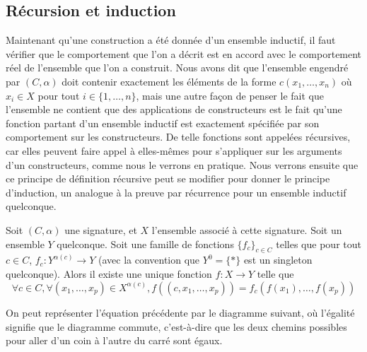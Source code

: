 \subsection{Récursion et induction}

Maintenant qu'une construction a été donnée d'un ensemble inductif, il faut
vérifier que le comportement que l'on a décrit est en accord avec le
comportement réel de l'ensemble que l'on a construit. Nous avons dit que
l'ensemble engendré par $(C,\alpha)$ doit contenir exactement les éléments de
la forme $c(x_1,\ldots,x_n)$ où $x_i \in X$ pour tout $i\in\{1,\ldots,n\}$, mais
une autre façon de penser le fait que l'ensemble ne contient que des
applications de constructeurs est le fait qu'une fonction partant d'un ensemble
inductif est exactement spécifiée par son comportement sur les constructeurs.
De telle fonctions sont appelées récursives, car elles peuvent faire appel à
elles-mêmes pour s'appliquer sur les arguments d'un constructeurs, comme nous le
verrons en pratique. Nous verrons ensuite que ce principe de définition
récursive peut se modifier pour donner le principe d'induction, un analogue à
la preuve par récurrence pour un ensemble inductif quelconque.

\begin{theorem}\label{thm.PU.ind}
  Soit $(C,\alpha)$ une signature, et $X$ l'ensemble associé à cette signature.
  Soit un ensemble $Y$ quelconque.
  Soit une famille de fonctions $\{f_c\}_{c\in C}$ telles que pour tout $c\in C$,
  $f_c : Y^{\alpha(c)} \to Y$ (avec la convention que $Y^0 = \{*\}$ est un
  singleton quelconque). Alors il existe une unique fonction $f : X \to Y$
  telle que
  \[\forall c\in C, \forall (x_1,\ldots,x_p)\in X^{\alpha(c)},
  f((c,x_1,\ldots,x_p)) = f_c (f(x_1),\ldots,f(x_p))\]
\end{theorem}

On peut représenter l'équation précédente par le diagramme suivant, où l'égalité
signifie que le diagramme commute, c'est-à-dire que les deux chemins possibles
pour aller d'un coin à l'autre du carré sont égaux.

\begin{center}
\end{center}

